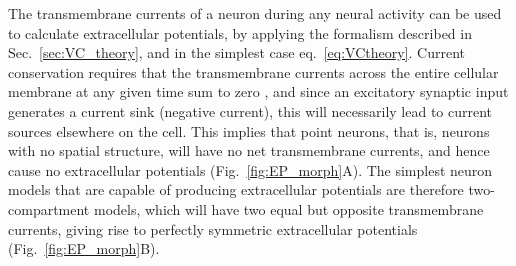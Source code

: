 \documentclass[preprint,11pt,authoryear]{elsarticle}
\newcommand{\hlb}[2][blue]{ {\sethlcolor{#1} \hl{#2}} }
\newcommand{\hlj}[2][OliveGreen]{ {\sethlcolor{#1} \hl{#2}} }
\newcommand{\hlR}[2][red]{ {\sethlcolor{#1} \hl{#2}} }
\newcommand{\ghnote}[1]{\color{white}{\hlb{GH: #1 }}\color{black}}
\newcommand{\gen}[1]{\color{white}{\hlR{GTE: #1 }}\color{black}}
\newcommand{\tvnnote}[1]{\color{white}{\hlj{TVN: #1 }}\color{black}}
\newcommand{\tvntxt}[1]{{\color{OliveGreen}#1}}
\begin{document}


The transmembrane currents of a neuron during any neural activity can be used to calculate extracellular potentials, by applying the formalism described in Sec.~\ref{sec:VC_theory}, and in the simplest case eq.~\ref{eq:VCtheory}.
Current conservation requires that the transmembrane currents across the entire cellular membrane at any given time sum to zero \citep{Koch1999, Nunez2006}, and since
an excitatory synaptic input generates a current sink (negative current), this will necessarily lead to current sources elsewhere on the cell. This implies that point neurons, that is, neurons with no spatial structure, will have no net transmembrane currents, and hence cause no extracellular potentials (Fig.~\ref{fig:EP_morph}A). The simplest neuron models that are capable of producing extracellular potentials are therefore two-compartment models, which will have two equal but opposite transmembrane currents,  
giving rise to perfectly symmetric extracellular potentials (Fig.~\ref{fig:EP_morph}B).

\end{document}
